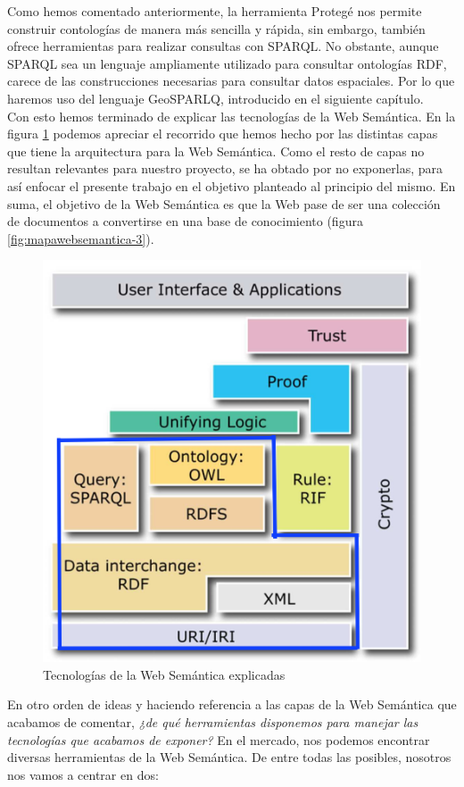 Como hemos comentado anteriormente, la herramienta Protegé nos permite construir contologías de manera más sencilla y rápida, sin embargo, también ofrece herramientas para realizar consultas con SPARQL. No obstante, aunque SPARQL sea un lenguaje ampliamente utilizado para consultar ontologías RDF, carece de las construcciones necesarias para consultar datos espaciales. Por lo que haremos uso del lenguaje GeoSPARLQ, introducido en el siguiente capítulo. \\

 Con esto hemos terminado de explicar las tecnologías de la Web Semántica. En la figura \ref{fig:arquitectura2copia} podemos apreciar el recorrido que hemos hecho por las distintas capas que tiene la arquitectura para la Web Semántica. Como el resto de capas no resultan relevantes para nuestro proyecto, se ha obtado por no exponerlas, para así enfocar el presente trabajo en el objetivo planteado al principio del mismo. En suma, el objetivo de la Web Semántica es que la Web pase de ser una colección de documentos a convertirse en una base de conocimiento (figura \ref{fig:mapawebsemantica-3}).

\begin{figure}[H]
	\centering
	\includegraphics[width=0.52\linewidth]{imagenes/capitulo3/arquitectura2copia}
	\caption{Tecnologías de la Web Semántica explicadas \cite{apuntes-clase-jose}}
	\label{fig:arquitectura2copia}
\end{figure}

En otro orden de ideas y haciendo referencia a las capas de la Web Semántica que acabamos de comentar, \textit{¿de qué herramientas disponemos para manejar las tecnologías que acabamos de exponer?} En el mercado, nos podemos encontrar diversas herramientas de la Web Semántica. De entre todas las posibles, nosotros nos vamos a centrar en dos: 

